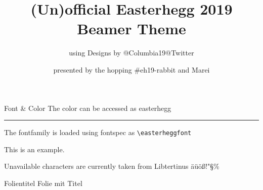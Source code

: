 \documentclass[aspectratio=169]{beamer}
\begin{document}
\title{(Un)official Easterhegg 2019 Beamer Theme}
\subtitle{\normalfont using Designs by @Columbia19@Twitter}
\author{presented by the hopping \#eh19-rabbit and Marei}

\frame{\titlepage}

\begin{frame}[fragile]{Font \& Color}
The color can be accessed as easterhegg \textcolor{easterhegg}{\rule{2cm}{2cm}}

The fontfamily is loaded using fontspec as \verb+\easterheggfont+

\easterheggfont This is an example.

Unavailable characters are currently taken from Libtertinus äüöß!"§\%
\end{frame}

\begin{frame}{Folientitel}
Folie mit Titel
\end{frame}
\end{document}
